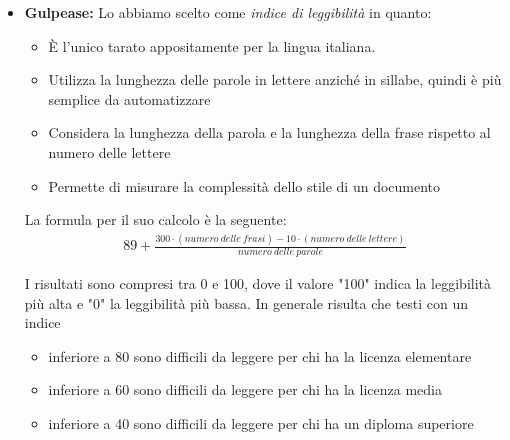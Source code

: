 \documentclass[a4paper]{article}
\begin{document}
				\begin{itemize}
				\item \textbf{Gulpease:} Lo abbiamo scelto come \emph{indice di leggibilità} in quanto:
				\begin{itemize}
					\item È l'unico tarato appositamente per la lingua italiana.
					\item Utilizza la lunghezza delle parole in lettere anziché in sillabe, quindi è più semplice da automatizzare
					\item Considera la lunghezza della parola e la lunghezza della frase rispetto al numero delle lettere
					\item Permette di misurare la complessità dello stile di un documento
				
				\end{itemize}
				La formula per il suo calcolo è la seguente:
				\begin{align}
					89+\frac{300\cdot(numero\ delle\ frasi)-10\cdot(numero\ delle\ lettere)}{numero\ delle\ parole}
				\end{align}
				
				I risultati sono compresi tra 0 e 100, dove il valore "100" indica la leggibilità più alta e "0" la leggibilità
				più bassa. In generale risulta che testi con un indice
				\begin{itemize}
					\item inferiore a 80 sono difficili da leggere per chi ha la licenza elementare
					\item inferiore a 60 sono difficili da leggere per chi ha la licenza media
					\item inferiore a 40 sono difficili da leggere per chi ha un diploma superiore
				\end{itemize}
	

\end{itemize}
\end{document}
